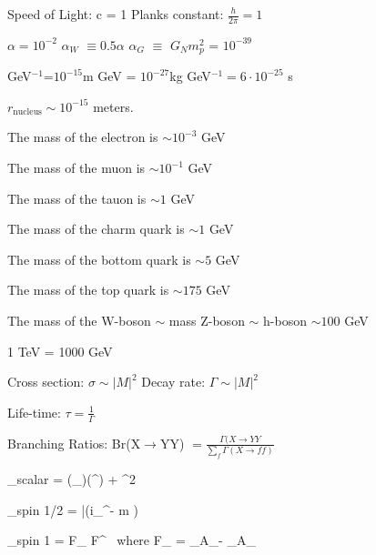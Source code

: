{\large

Speed of Light: c = 1  \hspace{1in} Planks constant: $\frac{h}{2\pi} = 1$

$\alpha = 10^{-2}$  \hspace{1in} $\alpha_W$ $\equiv 0.5 \alpha$ \hspace{1in} $\alpha_G$ $\equiv$ $G_N m_p^2$ = $10^{-39}$

GeV$^{-1}$=$10^{-15}$m  \hspace{1in} GeV = $10^{-27}$kg \hspace{1in}   GeV$^{-1} = 6 \cdot 10^{-25}$ s

$r_\textrm{nucleus} \sim 10^{-15}$ meters.

The mass of the electron is $\sim 10^{-3}$ GeV

The mass of the muon is $\sim 10^{-1}$ GeV

The mass of the tauon is $\sim 1$ GeV

The mass of the charm quark is $\sim 1$ GeV

The mass of the bottom quark is $\sim 5$ GeV

The mass of the top quark is $\sim 175$ GeV

The mass of the W-boson $\sim$ mass Z-boson $\sim$ h-boson $\sim 100$ GeV

1 TeV = 1000 GeV

Cross section: $\sigma \sim |M|^2 $  \hspace{1in} Decay rate: $\Gamma \sim |M|^2 $

Life-time: $\tau = \frac{1}{\Gamma}$  

Branching Ratios:  Br(X$\rightarrow$YY) $= \frac{\Gamma(X\rightarrow YY}{\sum_f \Gamma(X\rightarrow ff)}$

\be
{}_{scalar} =  (\partial_\mu \phi)(\partial^\mu \phi) +  \phi^2
\ee

\be
{}_{spin 1/2} = \bar{\psi}(i\gamma_\mu \partial^\mu - m )\psi
\ee

\be
{}_{spin 1} = F_{\mu\nu} F^{\mu\nu}\ \textrm{ where } F_{\mu\nu} = \partial_\mu A_\nu - \partial_\mu A_\nu
\ee

%
%

}






